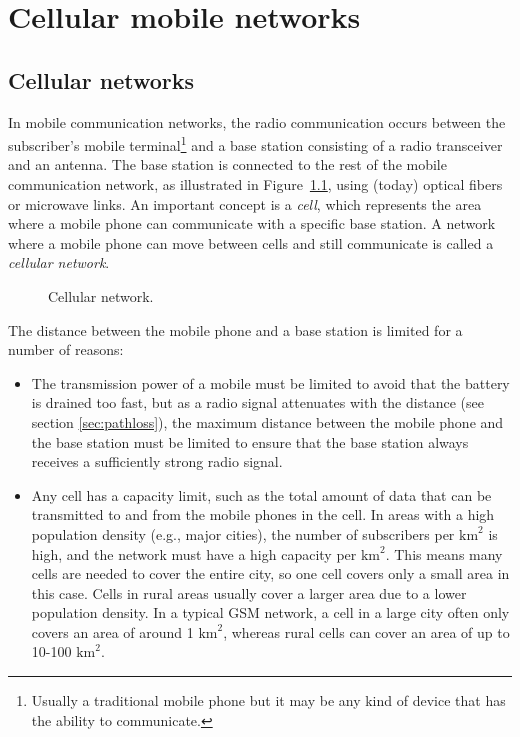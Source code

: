 \clearpage\chapter{Cellular mobile networks}

\section{Cellular networks}\label{sec:cellularnetworks}
In mobile communication networks, the radio communication occurs between the subscriber's mobile terminal\footnote{Usually a traditional mobile phone but it may be any kind of device that has the ability to communicate.} and a base station consisting of a radio transceiver and an antenna. The base station is connected to the rest of the mobile communication network, as illustrated in Figure~\ref{fig:ms_and_basestation}, using (today) optical fibers or microwave links. An important concept is a \emph{cell}, which represents the area where a mobile phone can communicate with a specific base station. A network where a mobile phone can move between cells and still communicate is called a \emph{cellular network}.

\begin{figure}[htbp]
\centering
{}
\captionsetup{format=hang,margin=2cm}
\caption{\label{fig:ms_and_basestation}Cellular network.}
\end{figure}

The distance between the mobile phone and a base station is limited for a number of reasons:

\begin{itemize}
%
\item The transmission power of a mobile must be limited to avoid that the battery is drained too fast, but as a radio signal attenuates with the distance (see section \ref{sec:pathloss}), the maximum distance between the mobile phone and the base station must be limited to ensure that the base station always receives a sufficiently strong radio signal.
%
\item Any cell has a capacity limit, such as the total amount of data that can be transmitted to and from the mobile phones in the cell. In areas with a high population density (e.g., major cities), the number of subscribers per $\textrm{km}^2$ is high, and the network must have a high capacity per $\textrm{km}^2$.  This means many cells are needed to cover the entire city, so one cell covers only a small area in this case. Cells in rural areas usually cover a larger area due to a lower population density. In a typical GSM network, a cell in a large city often only covers an area of around 1 $\textrm{km}^2$, whereas rural cells can cover an area of up to 10-100$\textrm{ km}^2$.
%
\end{itemize}

